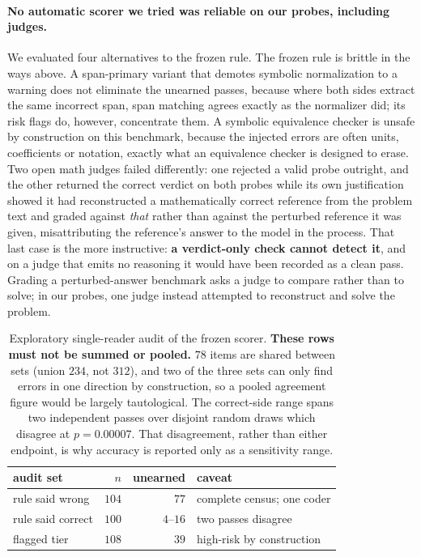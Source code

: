 \documentclass[10pt,twocolumn,letterpaper]{article}
\begin{document}
\paragraph{No automatic scorer we tried was reliable on our probes, including judges.}
We evaluated four alternatives to the frozen rule. The frozen rule is
brittle in the ways above. A
span-primary variant that demotes symbolic normalization to a warning
does not eliminate the unearned passes, because where both sides extract
the same incorrect span, span matching agrees exactly as the normalizer
did; its risk flags do, however, concentrate them. A symbolic equivalence
checker is unsafe by construction on this benchmark, because the injected
errors are often units, coefficients or notation, exactly what an equivalence checker is
designed to erase. Two open math judges failed differently: one rejected
a valid probe outright, and the other returned the correct verdict on
both probes while its own justification showed it had reconstructed a
mathematically correct reference from the problem text and graded against
\emph{that} rather than against the perturbed reference it was given,
misattributing the reference's answer to the model in the process. That
last case is the more instructive: \textbf{a verdict-only check cannot
detect it}, and on a judge that emits no reasoning it would have been
recorded as a clean pass. Grading a perturbed-answer benchmark asks a
judge to compare rather than to solve; in our probes, one judge instead
attempted to reconstruct and solve the problem.

\begin{table}[t]\centering\small
\begin{tabularx}{\linewidth}{@{}>{\raggedright\arraybackslash}Xrr>{\raggedright\arraybackslash}X@{}}
\toprule
audit set & $n$ & unearned & caveat \\
\midrule
rule said wrong   & $104$ & $77$ & complete census; one coder \\
rule said correct & $100$ & $4$--$16$ & two passes disagree \\
flagged tier      & $108$ & $39$ & high-risk by construction \\
\bottomrule
\end{tabularx}
\caption{Exploratory single-reader audit of the frozen scorer.
\textbf{These rows must not be
summed or pooled.} $78$ items are shared between sets (union $234$, not
$312$), and two of the three sets can only find errors in one direction
by construction, so a pooled agreement figure would be largely
tautological. The correct-side range spans two independent passes over
disjoint random draws which disagree at $p=0.00007$. That disagreement,
rather than either endpoint, is why accuracy is reported only as a
sensitivity range.}
\label{tab:audit}
\end{table}
\end{document}
